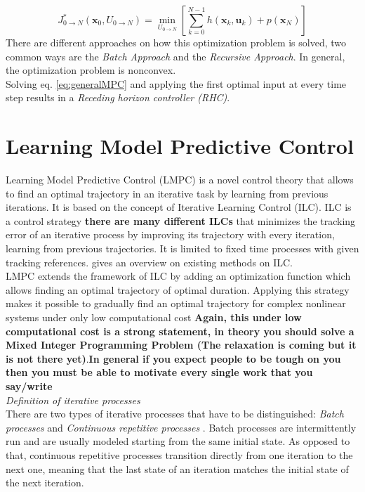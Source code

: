 \begin{equation}\label{eq:generalMPC}
J_{0\rightarrow N}^*(\bm{x}_0,U_{0\rightarrow N})=\min_{U_{0\rightarrow N}}\left[\sum_{k=0}^{N-1}h(\bm{x}_k,\bm{u}_k) + p(\bm{x}_N)\right]
\end{equation}
There are different approaches on how this optimization problem is solved, two common ways are the \emph{Batch Approach} and the \emph{Recursive Approach}. In general, the optimization problem is nonconvex.\\
Solving eq. \ref{eq:generalMPC} and applying the first optimal input at every time step results in a \emph{Receding horizon controller (RHC)}.

\section{Learning Model Predictive Control}\label{sec:LMPC}
Learning Model Predictive Control (LMPC) is a novel control theory that allows to find an optimal trajectory in an iterative task by learning from previous iterations. It is based on the concept of Iterative Learning Control (ILC). ILC is a control strategy {\bfseries{there are many different ILCs}} that minimizes the tracking error of an iterative process by improving its trajectory with every iteration, learning from previous trajectories. It is limited to fixed time processes with given tracking references. \cite{Lee2007} gives an overview on existing methods on ILC.\\
LMPC extends the framework of ILC by adding an optimization function which allows finding an optimal trajectory of optimal duration. Applying this strategy makes it possible to gradually find an optimal trajectory for complex nonlinear systems under only low computational cost {\bfseries{Again, this under low computational cost is a strong statement, in theory you should solve a Mixed Integer Programming Problem (The relaxation is coming but it is not there yet)}}.{\bfseries{In general if you expect people  to be tough on you then you must be able to motivate every single work that you say/write}}\\
\emph{Definition of iterative processes}\\
There are two types of iterative processes that have to be distinguished: \emph{Batch processes} and \emph{Continuous repetitive processes} \cite{Wang2009}. Batch processes are intermittently run and are usually modeled starting from the same initial state. As opposed to that, continuous repetitive processes transition directly from one iteration to the next one, meaning that the last state of an iteration matches the initial state of the next iteration.
